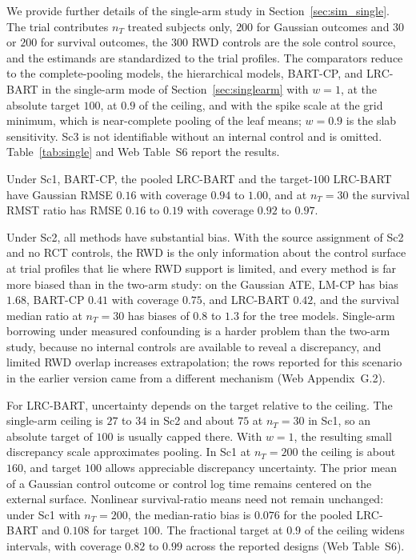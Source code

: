 We provide further details of the single-arm study in Section~\ref{sec:sim_single}. The trial contributes $n_T$ treated subjects only, $200$ for Gaussian outcomes and $30$ or $200$ for survival outcomes, the $300$ RWD controls are the sole control source, and the estimands are standardized to the trial profiles. The comparators reduce to the complete-pooling models, the hierarchical models, BART-CP, and LRC-BART in the single-arm mode of Section~\ref{sec:singlearm} with $w=1$, at the absolute target $100$, at $0.9$ of the ceiling, and with the spike scale at the grid minimum, which is near-complete pooling of the leaf means; $w=0.9$ is the slab sensitivity. Sc3 is not identifiable without an internal control and is omitted. Table~\ref{tab:single} and Web Table~S6 report the results.

Under Sc1, BART-CP, the pooled LRC-BART and the target-$100$ LRC-BART have Gaussian RMSE $0.16$ with coverage $0.94$ to $1.00$, and at $n_T=30$ the survival RMST ratio has RMSE $0.16$ to $0.19$ with coverage $0.92$ to $0.97$.

Under Sc2, all methods have substantial bias. With the source assignment of Sc2 and no RCT controls, the RWD is the only information about the control surface at trial profiles that lie where RWD support is limited, and every method is far more biased than in the two-arm study: on the Gaussian ATE, LM-CP has bias $1.68$, BART-CP $0.41$ with coverage $0.75$, and LRC-BART $0.42$, and the survival median ratio at $n_T=30$ has biases of $0.8$ to $1.3$ for the tree models. Single-arm borrowing under measured confounding is a harder problem than the two-arm study, because no internal controls are available to reveal a discrepancy, and limited RWD overlap increases extrapolation; the rows reported for this scenario in the earlier version came from a different mechanism (Web Appendix~G.2).

For LRC-BART, uncertainty depends on the target relative to the ceiling. The single-arm ceiling is $27$ to $34$ in Sc2 and about $75$ at $n_T=30$ in Sc1, so an absolute target of $100$ is usually capped there. With $w=1$, the resulting small discrepancy scale approximates pooling. In Sc1 at $n_T=200$ the ceiling is about $160$, and target $100$ allows appreciable discrepancy uncertainty. The prior mean of a Gaussian control outcome or control log time remains centered on the external surface. Nonlinear survival-ratio means need not remain unchanged: under Sc1 with $n_T=200$, the median-ratio bias is $0.076$ for the pooled LRC-BART and $0.108$ for target $100$. The fractional target at $0.9$ of the ceiling widens intervals, with coverage $0.82$ to $0.99$ across the reported designs (Web Table~S6).

